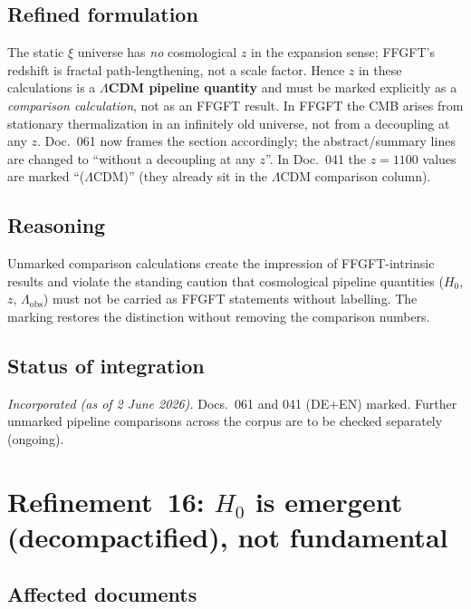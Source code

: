 \subsection*{Refined formulation}

The static $\xi$ universe has \emph{no} cosmological $z$ in the expansion
sense; FFGFT's redshift is fractal path-lengthening, not a scale factor. Hence
$z$ in these calculations is a \textbf{$\Lambda$CDM pipeline quantity} and must
be marked explicitly as a \emph{comparison calculation}, not as an FFGFT
result. In FFGFT the CMB arises from stationary thermalization in an
infinitely old universe, not from a decoupling at any $z$. Doc.~061 now frames
the section accordingly; the abstract/summary lines are changed to
\enquote{without a decoupling at any $z$}. In Doc.~041 the $z=1100$ values are
marked \enquote{($\Lambda$CDM)} (they already sit in the $\Lambda$CDM
comparison column).

\subsection*{Reasoning}

Unmarked comparison calculations create the impression of FFGFT-intrinsic
results and violate the standing caution that cosmological pipeline quantities
($H_0$, $z$, $\Lambda_{\text{obs}}$) must not be carried as FFGFT statements
without labelling. The marking restores the distinction without removing the
comparison numbers.

\subsection*{Status of integration}

\emph{Incorporated (as of 2 June 2026).} Docs.~061 and 041 (DE+EN) marked.
Further unmarked pipeline comparisons across the corpus are to be checked
separately (ongoing).

\section{\texorpdfstring{Refinement~16: $H_0$ is emergent (decompactified), not fundamental}{Refinement 16: H0 is emergent, not fundamental}}

\subsection*{Affected documents}

